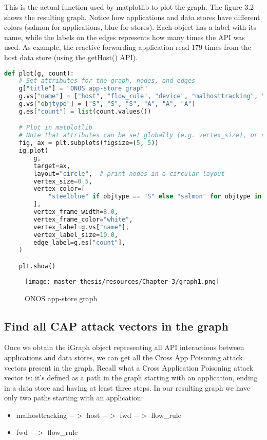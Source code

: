 \documentclass[a4paper,10pt]{memoir}
\begin{document}
This is the actual function used by matplotlib to plot the graph. The figure 3.2 shows the resulting graph. Notice how applications and data stores have different colors (salmon for applications, blue for stores). Each object has a label with its name, while the labels on the edges represents how many times the API was used. As example, the reactive forwarding application read 179 times from the host data store (using the getHost() API). 
\begin{lstlisting}[language=python,firstnumber=76]
def plot(g, count):
    # Set attributes for the graph, nodes, and edges
    g["title"] = "ONOS app-store graph"
    g.vs["name"] = ["host", "flow_rule", "device", "malhosttracking", "fwd", "test"]
    g.vs["objtype"] = ["S", "S", "S", "A", "A", "A"]
    g.es["count"] = list(count.values())

    # Plot in matplotlib
    # Note that attributes can be set globally (e.g. vertex_size), or set individually using arrays (e.g. vertex_color)
    fig, ax = plt.subplots(figsize=(5, 5))
    ig.plot(
        g,
        target=ax,
        layout="circle",  # print nodes in a circular layout
        vertex_size=0.5,
        vertex_color=[
            "steelblue" if objtype == "S" else "salmon" for objtype in g.vs["objtype"]
        ],
        vertex_frame_width=8.0,
        vertex_frame_color="white",
        vertex_label=g.vs["name"],
        vertex_label_size=10.0,
        edge_label=g.es["count"],
    )

    plt.show()
\end{lstlisting}

\begin{figure}[h]
\caption{ONOS app-store graph}
\label{fig:onos-log-graph}
\texttt{[image: master-thesis/resources/Chapter-3/graph1.png]}
\centering
\end{figure}

\subsection{Find all CAP attack vectors in the graph}
Once we obtain the iGraph object representing all API interactions between applications and data stores, we can get all the Cross App Poisoning attack vectors present in the graph. Recall what a  Cross Application Poisoning attack vector is: it's defined as a path in the graph starting with an application, ending in a data store and having at least three steps. In our resulting graph we have only two paths starting with an application:
\begin{itemize}
    \item malhosttracking $->$ host $->$ fwd $->$ flow\_rule
    \item fwd $->$ flow\_rule
\end{itemize}
\end{document}
